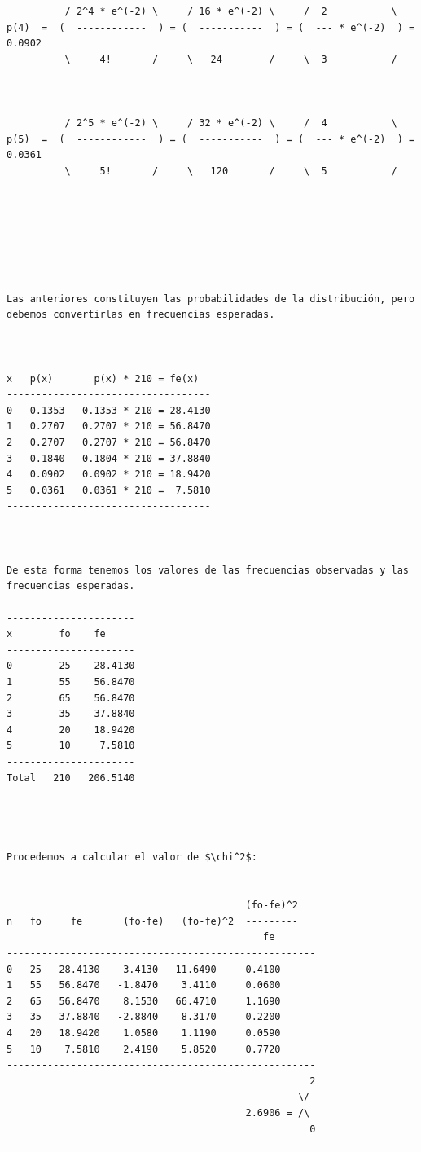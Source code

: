 \begin{verbatim}
          / 2^4 * e^(-2) \     / 16 * e^(-2) \     /  2           \ 
p(4)  =  (  ------------  ) = (  -----------  ) = (  --- * e^(-2)  ) =  0.0902
          \     4!       /     \   24        /     \  3           / 



          / 2^5 * e^(-2) \     / 32 * e^(-2) \     /  4           \ 
p(5)  =  (  ------------  ) = (  -----------  ) = (  --- * e^(-2)  ) =  0.0361
          \     5!       /     \   120       /     \  5           / 







Las anteriores constituyen las probabilidades de la distribución, pero debemos convertirlas en frecuencias esperadas.


-----------------------------------
x   p(x)       p(x) * 210 = fe(x)
-----------------------------------
0   0.1353   0.1353 * 210 = 28.4130
1   0.2707   0.2707 * 210 = 56.8470
2   0.2707   0.2707 * 210 = 56.8470
3   0.1840   0.1804 * 210 = 37.8840
4   0.0902   0.0902 * 210 = 18.9420
5   0.0361   0.0361 * 210 =  7.5810
-----------------------------------



De esta forma tenemos los valores de las frecuencias observadas y las frecuencias esperadas.

----------------------
x        fo    fe
----------------------
0        25    28.4130
1        55    56.8470
2        65    56.8470 
3        35    37.8840
4        20    18.9420
5        10     7.5810
----------------------
Total   210   206.5140
----------------------



Procedemos a calcular el valor de $\chi^2$:

-----------------------------------------------------
                                         (fo-fe)^2
n   fo     fe       (fo-fe)   (fo-fe)^2  ---------
                                            fe
-----------------------------------------------------
0   25   28.4130   -3.4130   11.6490     0.4100
1   55   56.8470   -1.8470    3.4110     0.0600
2   65   56.8470    8.1530   66.4710     1.1690
3   35   37.8840   -2.8840    8.3170     0.2200
4   20   18.9420    1.0580    1.1190     0.0590 
5   10    7.5810    2.4190    5.8520     0.7720
-----------------------------------------------------
                                                    2
                                                  \/
                                         2.6906 = /\
                                                    0
-----------------------------------------------------




\end{verbatim}
